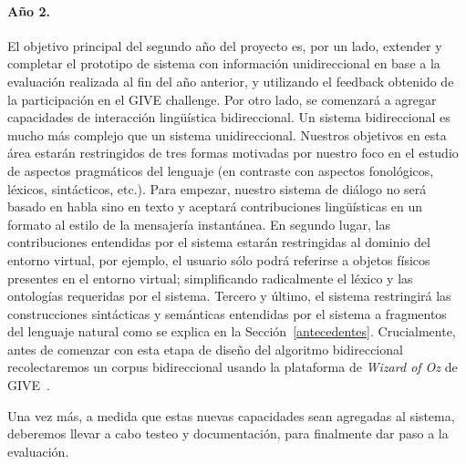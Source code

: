 \documentclass[11pt]{article}
\begin{document}
\paragraph{A\~no 2.} El objetivo principal del segundo a\~no del proyecto es,
por un lado, extender y completar el prototipo de sistema con informaci\'on
unidireccional en base a la evaluaci\'on realizada al fin del a\~no anterior,
y utilizando el feedback obtenido de la
participaci\'on en el GIVE challenge.  Por otro lado, se comenzar\'a a agregar
capacidades de interacci\'on ling\"u\'istica bidireccional.
Un sistema bidireccional es mucho m\'as complejo que un sistema unidireccional. 
Nuestros objetivos en esta \'area estar\'an
restringidos de tres formas motivadas por nuestro foco en el estudio de
aspectos pragm\'aticos del lenguaje (en contraste con aspectos fonol\'ogicos,
l\'exicos, sint\'acticos, etc.). Para empezar, nuestro sistema de di\'alogo no
ser\'a basado en habla sino en texto y aceptar\'a contribuciones
ling\"u\'isticas en un formato al estilo de la mensajer\'ia instant\'anea.
En segundo lugar, las contribuciones entendidas por el sistema estar\'an
restringidas al dominio del entorno virtual, por ejemplo, el usuario s\'olo
podr\'a referirse a objetos f\'isicos presentes en el entorno virtual; 
simplificando radicalmente el l\'exico y las ontolog\'ias requeridas por el
sistema. Tercero y \'ultimo, el sistema restringir\'a las
construcciones sint\'acticas y sem\'anticas entendidas por el sistema a
fragmentos del lenguaje natural como se explica en la
Secci\'on~\ref{antecedentes}. Crucialmente, antes de comenzar con esta etapa de
dise\~no del algoritmo bidireccional recolectaremos un corpus bidireccional
usando la plataforma de \emph{Wizard of Oz} de GIVE~\citep{gargett10}. 

Una vez m\'as, a medida que
estas nuevas capacidades sean agregadas al sistema, deberemos llevar a
cabo testeo y documentaci\'on, para finalmente dar paso a la evaluaci\'on.
\end{document}

